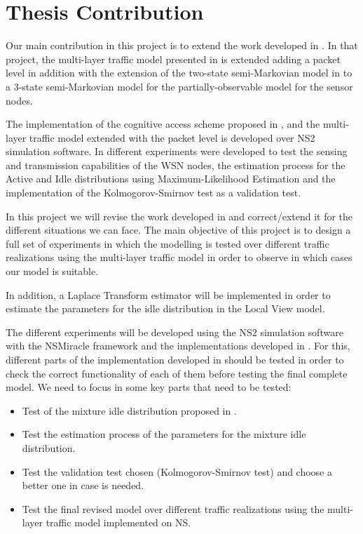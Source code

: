 \section{Thesis Contribution} \label{sec:intro_contribution}
Our main contribution in this project is to extend the work developed in \cite{marcello}. In that project, the multi-layer traffic model presented in \cite{Campus-WLAN} is extended adding a packet level in addition with the extension of the two-state semi-Markovian model in \cite{DSA-Emp} to a 3-state semi-Markovian model for the partially-observable model for the sensor nodes.

The implementation of the cognitive access scheme proposed in \cite{ioannis}, and the multi-layer traffic model extended with the packet level is developed over NS2 simulation software. In \cite{marcello} different experiments were developed to test the sensing and transmission capabilities of the \acs{WSN} nodes, the estimation process for the Active and Idle distributions using Maximum-Likelihood Estimation and the implementation of the Kolmogorov-Smirnov test as a validation test.

In this project we will revise the work developed in \cite{marcello} and correct/extend it for the different situations we can face. The main objective of this project is to design a full set of experiments in which the modelling is tested over different traffic realizations using the multi-layer traffic model in order to observe in which cases our model is suitable.

In addition, a Laplace Transform estimator will be implemented in order to estimate the parameters for the idle distribution in the Local View model.

The different experiments will be developed using the NS2 simulation software with the NSMiracle framework and the implementations developed in \cite{marcello}. For this, different parts of the implementation developed in \cite{marcello} should be tested in order to check the correct functionality of each of them before testing the final complete model. We need to focus in some key parts that need to be tested:

\begin{itemize}
	\item Test of the mixture idle distribution proposed in \cite{DSA-Emp}.
	\item Test the estimation process of the parameters for the mixture idle distribution.
	\item Test the validation test chosen (Kolmogorov-Smirnov test) and choose a better one in case is needed.
	\item Test the final revised model over different traffic realizations using the multi-layer traffic model implemented on NS.
\end {itemize}

